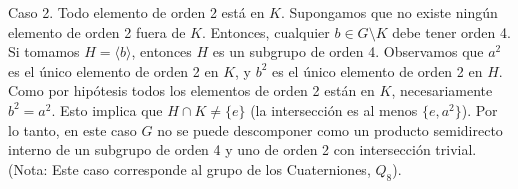 \begin{eje}
Caso 2. Todo elemento de orden 2 está en $K$.
Supongamos que no existe ningún elemento de orden 2 fuera de $K$. Entonces, cualquier $b \in G \setminus K$ debe tener orden 4.
Si tomamos $H = \langle b \rangle$, entonces $H$ es un subgrupo de orden 4.
Observamos que $a^2$ es el único elemento de orden 2 en $K$, y $b^2$ es el único elemento de orden 2 en $H$. Como por hipótesis todos los elementos de orden 2 están en $K$, necesariamente $b^2 = a^2$.
Esto implica que $H \cap K \neq \{e\}$ (la intersección es al menos $\{e, a^2\}$).
Por lo tanto, en este caso $G$ no se puede descomponer como un producto semidirecto interno de un subgrupo de orden 4 y uno de orden 2 con intersección trivial.
(Nota: Este caso corresponde al grupo de los Cuaterniones, $Q_8$).

\end{eje}

